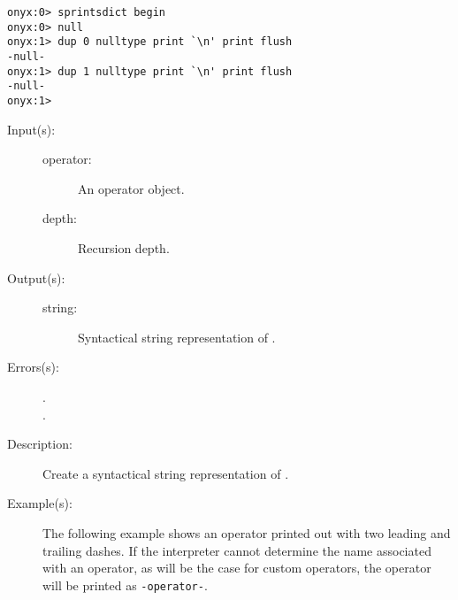 \begin{description}
\begin{description}
\begin{verbatim}
onyx:0> sprintsdict begin
onyx:0> null
onyx:1> dup 0 nulltype print `\n' print flush
-null-
onyx:1> dup 1 nulltype print `\n' print flush
-null-
onyx:1>
		\end{verbatim}
	\end{description}
\label{sprintsdict:operatortype}
\item[{\onyxop{operator depth}{operatortype}{string}}: ]
	\begin{description}\item[]
	\item[Input(s): ]
		\begin{description}\item[]
		\item[operator: ]
			An operator object.
		\item[depth: ]
			Recursion depth.
		\end{description}
	\item[Output(s): ]
		\begin{description}\item[]
		\item[string: ]
			Syntactical string representation of .
		\end{description}
	\item[Errors(s): ]
		\begin{description}\item[]
		\item[.]
		\item[.]
		\end{description}
	\item[Description: ]
		Create a syntactical string representation of .
	\item[Example(s): ]
		The following example shows an operator printed out with two
		leading and trailing dashes.  If the interpreter cannot
		determine the name associated with an operator, as will be the
		case for custom operators, the operator will be printed as
		{\tt -operator-}.
		\begin{verbatim}


\end{verbatim}
\end{description}
\end{description}
